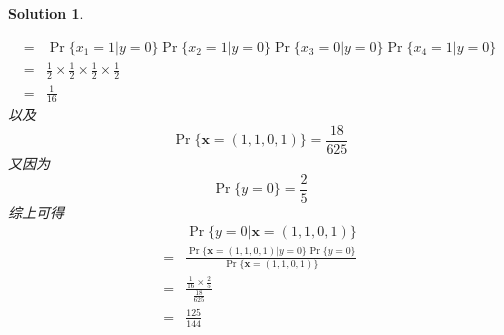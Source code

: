\documentclass[a4paper,UTF8]{article}
\numberwithin{equation}{section}
\newtheorem*{mySol}{Solution}
\begin{document}
\begin{mySol}
\begin{enumerate}[ {(}1{)}]
\begin{equation}
\begin{aligned}
=& \Pr\{x_1 = 1 | y = 0\}\Pr\{x_2 = 1 | y = 0\}\Pr\{x_3 = 0 | y = 0\}\Pr\{x_4 = 1 | y = 0\}\\
=& \frac{1}{2}\times\frac{1}{2}\times\frac{1}{2}\times\frac{1}{2}\\
=& \frac{1}{16}
\end{aligned}
\end{equation}
以及
\begin{equation}
\Pr\{\mathbf{x}=(1,1,0,1)\} = \frac{18}{625}
\end{equation}
又因为
\begin{equation}
\Pr\{y=0\} = \frac{2}{5}
\end{equation}
综上可得
\begin{equation}
\begin{aligned}
&\Pr\{ y=0 | \mathbf{x}=(1,1,0,1) \}\\ 
=& \frac{\Pr\{\mathbf{x}=(1,1,0,1) | y=0  \} \Pr\{y=0\}}{\Pr\{\mathbf{x}=(1,1,0,1) \}}\\
=& \frac{\frac{1}{16}\times\frac{2}{5}}{\frac{18}{625}}\\ 
=& \frac{125}{144} 
\end{aligned}
\end{equation}


\end{enumerate}
\end{mySol}
\end{document}
